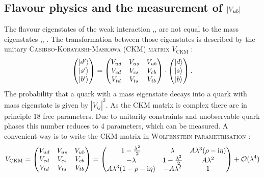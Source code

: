 \subsection{Flavour physics and the measurement of $|{V_{{u}{b}}}|$}
The flavour eigenstates of the weak interaction ,,   are not equal to the mass eigenstates \ket{\dquark},\ket{\squark},  \ket{\bquark}.
The transformation between those eigenstates is described by the unitary \textsc{Cabibbo-Kobayashi-Maskawa (CKM) matrix} $V_\text{CKM}$ \cite{Kobayashi_CKM}:
\begin{align}
\begin{pmatrix}
|d'\rangle \\ |s'\rangle \\ |b'\rangle
\end{pmatrix}
=
\begin{pmatrix}
V_{ud} & V_{us} & V_{ub} \\
V_{cd} & V_{cs} & V_{cb} \\
V_{td} & V_{ts} & V_{tb} \\
\end{pmatrix}
\cdot
\begin{pmatrix}
|d\rangle \\ |s\rangle \\ |b\rangle
\end{pmatrix}.
\end{align}
The probability that a quark with a mass eigenstate  decays into a quark with mass eigenstate  is given by $|V_{ij}|^2$.
As the CKM matrix is complex there are in principle 18 free parameters.
Due to unitarity constraints and unobservable quark phases this number reduces to 4 parameters, which can be measured.
A convenient way is to write the CKM matrix in \textsc{Wolfenstein parametrisation} \cite{Wolfenstein}:
\begin{align}
    V_{\text{CKM}}=
    \begin{pmatrix}
    V_{ud} & V_{us} & V_{ub} \\
    V_{cd} & V_{cs} & V_{cb} \\
    V_{td} & V_{ts} & V_{tb} \\
    \end{pmatrix}
    =
    \begin{pmatrix}
    1-\frac{\lambda^2}{2} & \lambda & A\lambda^3(\rho-\mathrm{i}\eta) \\
    -\lambda & 1-\frac{\lambda^2}{2} & A\lambda^2 \\
    A\lambda^3(1-\rho-\mathrm{i}\eta) & -A\lambda^2 & 1
    \end{pmatrix}
    + \mathcal{O}(\lambda^4)
\end{align}
